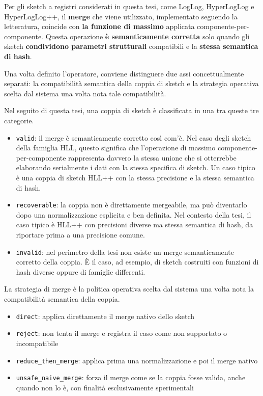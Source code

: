 Per gli sketch a registri considerati in questa tesi, come LogLog, HyperLogLog e HyperLogLog++,
il \textbf{merge} che viene utilizzato, implementato seguendo la letteratura, coincide con \textbf{la funzione di massimo} applicata componente-per-componente. Questa operazione \textbf{è semanticamente corretta}
solo quando gli sketch \textbf{condividono parametri strutturali} compatibili e la \textbf{stessa semantica di hash}.

Una volta definito l'operatore, conviene distinguere due assi concettualmente separati:
la compatibilità semantica della coppia di sketch e la strategia operativa scelta dal sistema
una volta nota tale compatibilità.

\begin{definition}
Nel seguito di questa tesi, una coppia di sketch è classificata in una tra queste tre categorie.
\begin{itemize}
    \item \texttt{valid}: il merge è semanticamente corretto così com'è. Nel caso degli sketch della famiglia HLL,
    questo significa che l'operazione di massimo componente-per-componente rappresenta davvero la stessa unione
    che si otterrebbe elaborando serialmente i dati con la stessa specifica di sketch. Un caso tipico è una coppia
    di sketch HLL++ con la stessa precisione e la stessa semantica di hash.
    \item \texttt{recoverable}: la coppia non è direttamente mergeabile, ma può diventarlo dopo una normalizzazione
    esplicita e ben definita. Nel contesto della tesi, il caso tipico è HLL++ con precisioni diverse ma stessa semantica di hash,
    da riportare prima a una precisione comune.
    \item \texttt{invalid}: nel perimetro della tesi non esiste un merge semanticamente corretto della coppia.
    È il caso, ad esempio, di sketch costruiti con funzioni di hash diverse oppure di famiglie differenti.
\end{itemize}
\end{definition}

\begin{definition}
La strategia di merge è la politica operativa scelta dal sistema una volta nota la compatibilità semantica della coppia.
\begin{itemize}
    \item \texttt{direct}: applica direttamente il merge nativo dello sketch
    \item \texttt{reject}: non tenta il merge e registra il caso come non supportato o incompatibile
    \item \texttt{reduce\_then\_merge}: applica prima una normalizzazione e poi il merge nativo
    \item \texttt{unsafe\_naive\_merge}: forza il merge come se la coppia fosse valida, anche quando non lo è,
    con finalità esclusivamente sperimentali
\end{itemize}
\end{definition}

